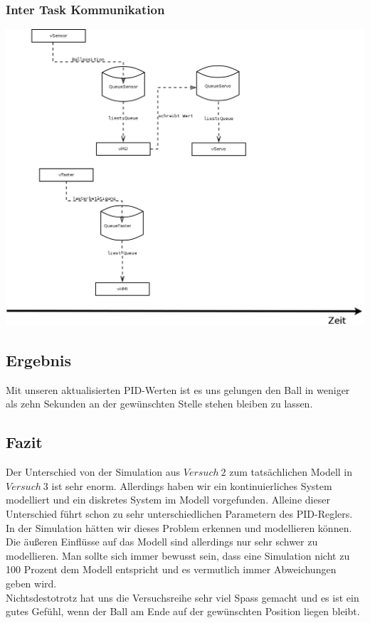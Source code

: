 \subsubsection{Inter Task Kommunikation}
\includegraphics[scale=0.4]{UML.png}

\subsection{Ergebnis}
Mit unseren aktualisierten PID-Werten ist es uns gelungen den Ball in weniger als zehn Sekunden an der gewünschten Stelle stehen bleiben zu lassen.\\

\subsection{Fazit}
Der Unterschied von der Simulation aus $Versuch\ 2$ zum tatsächlichen Modell in $Versuch\ 3$ ist sehr enorm. Allerdings haben wir ein kontinuierliches System modelliert und ein diskretes System im Modell vorgefunden. Alleine dieser Unterschied führt schon zu sehr unterschiedlichen Parametern des PID-Reglers. In der Simulation hätten wir dieses Problem erkennen und modellieren können. \\
Die äußeren Einflüsse auf das Modell sind allerdings nur sehr schwer zu modellieren. Man sollte sich immer bewusst sein, dass eine Simulation nicht zu 100 Prozent dem Modell entspricht und es vermutlich immer Abweichungen geben wird. \\
Nichtsdestotrotz hat uns die Versuchsreihe sehr viel Spass gemacht und es ist ein gutes Gefühl, wenn der Ball am Ende auf der gewünschten Position liegen bleibt.